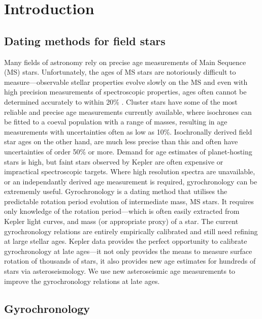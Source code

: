 \documentclass[10pt,preprint]{aastex}
\begin{document}
\section{Introduction}
\label{intro}
\subsection{Dating methods for field stars}

Many fields of astronomy rely on precise age measurements of Main Sequence (MS) stars.
Unfortunately, the ages of MS stars are notoriously difficult to measure---observable stellar properties evolve slowly on the MS and even with high precision measurements of spectroscopic properties, ages often cannot be determined accurately to within 20\% \citep{Soderblom2010}.
Cluster stars have some of the most reliable and precise age measurements currently available, where isochrones can be fitted to a coeval population with a range of masses, resulting in age measurements with uncertainties often as low as 10\%.
Isochronally derived field star ages on the other hand, are much less precise than this and often have uncertainties of order 50\% or more.
Demand for age estimates of planet-hosting stars is high, but faint stars observed by Kepler are often expensive or impractical spectroscopic targets.
Where high resolution spectra are unavailable, or an independantly derived age measurement is required, gyrochronology can be extrememly useful.
Gyrochronology is a dating method that utilises the predictable rotation period evolution of intermediate mass, MS stars.
It requires only knowledge of the rotation period---which is often easily extracted from Kepler light curves, and mass (or appropriate proxy) of a star.
The current gyrochronology relations are entirely empirically calibrated and still need refining at large stellar ages.
Kepler data provides the perfect opportunity to calibrate gyrochronology at late ages---it not only provides the means to measure surface rotation of thousands of stars, it also provides new age estimates for hundreds of stars via asteroseismology.
We use new asteroseismic age measurements to improve the gyrochronology relations at late ages.

\subsection{Gyrochronology}
\end{document}
